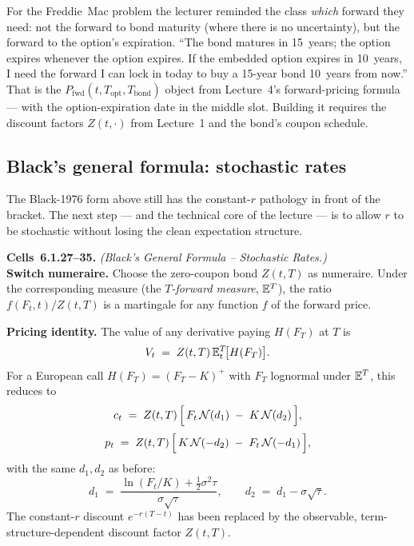 For the Freddie~Mac problem the lecturer reminded the class \emph{which}
forward they need: not the forward to bond maturity (where there is no
uncertainty), but the forward to the option's expiration. ``The bond
matures in 15~years; the option expires whenever the option expires.
If the embedded option expires in 10~years, I need the forward I can
lock in today to buy a 15-year bond 10~years from now.'' That is the
$P_{\text{fwd}}(t, T_{\text{opt}}, T_{\text{bond}})$ object from
Lecture~4's forward-pricing formula --- with the option-expiration date
in the middle slot. Building it requires the discount factors $Z(t,
\cdot)$ from Lecture~1 and the bond's coupon schedule.

\subsection{Black's general formula: stochastic rates}\label{L5-sec:black-general}

The Black-1976 form above still has the constant-$r$ pathology in front
of the bracket. The next step --- and the technical core of the
lecture --- is to allow $r$ to be stochastic without losing the
clean expectation structure.

\begin{keyblock}
\textbf{Cells~6.1.27--35.} \emph{(Black's General Formula -- Stochastic
Rates.)}\\
\textbf{Switch numeraire.} Choose the zero-coupon bond $Z(t,T)$ as
numeraire. Under the corresponding measure (the \emph{$T$-forward
measure}, $\mathbb{E}^T$), the ratio $f(F_t,t)/Z(t,T)$ is a martingale for any
function $f$ of the forward price.

\textbf{Pricing identity.} The value of any derivative paying $H(F_T)$
at $T$ is
\[
  V_t \;=\; Z(t,T)\,\mathbb{E}^T_t\!\bigl[H(F_T)\bigr].
\]
For a European call $H(F_T) = (F_T - K)^+$ with $F_T$ lognormal under
$\mathbb{E}^T$, this reduces to
\[
  c_t \;=\; Z(t,T)\,\Bigl[\, F_t\,\mathcal{N}(d_1) \;-\; K\,\mathcal{N}(d_2)\,\Bigr],
\]
\[
  p_t \;=\; Z(t,T)\,\Bigl[\, K\,\mathcal{N}(-d_2) \;-\; F_t\,\mathcal{N}(-d_1)\,\Bigr],
\]
with the same $d_1, d_2$ as before:
\[
  d_1 \;=\; \frac{\ln(F_t/K) + \tfrac{1}{2}\sigma^2\tau}{\sigma\sqrt{\tau}},
  \qquad d_2 \;=\; d_1 - \sigma\sqrt{\tau}.
\]
The constant-$r$ discount $e^{-r(T-t)}$ has been replaced by the
observable, term-structure-dependent discount factor $Z(t,T)$.
\end{keyblock}

